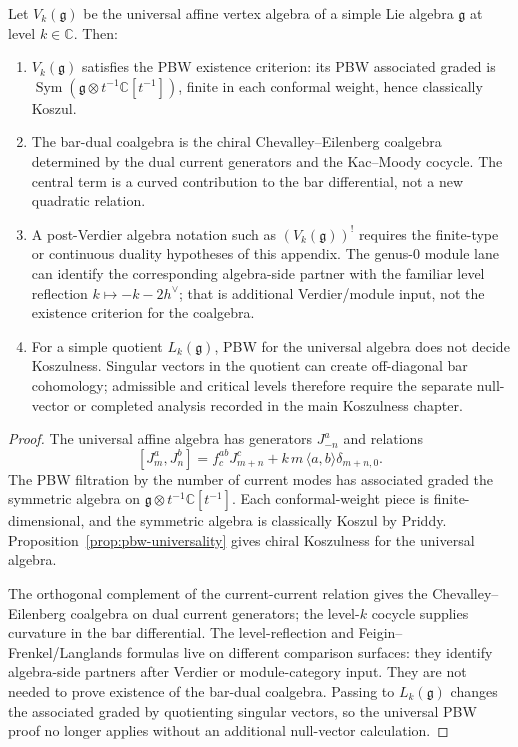 \begin{proposition}\label{prop:kac-moody-koszul-duals}
Let $V_k(\mathfrak g)$ be the universal affine vertex algebra of a
simple Lie algebra $\mathfrak g$ at level $k\in\mathbb C$. Then:
\begin{enumerate}
\item $V_k(\mathfrak g)$ satisfies the PBW existence criterion:
 its PBW associated graded is
 $\operatorname{Sym}(\mathfrak g\otimes t^{-1}\mathbb C[t^{-1}])$,
 finite in each conformal weight, hence classically Koszul.
\item The bar-dual coalgebra is the chiral Chevalley--Eilenberg
 coalgebra determined by the dual current generators and the
 Kac--Moody cocycle. The central term is a curved contribution to
 the bar differential, not a new quadratic relation.
\item A post-Verdier algebra notation such as
 $(V_k(\mathfrak g))^!$ requires the finite-type or continuous
 duality hypotheses of this appendix. The genus-$0$ module lane can
 identify the corresponding algebra-side partner with the familiar
 level reflection $k\mapsto -k-2h^\vee$; that is additional
 Verdier/module input, not the existence criterion for the coalgebra.
\item For a simple quotient $L_k(\mathfrak g)$, PBW for the universal
 algebra does not decide Koszulness. Singular vectors in the quotient
 can create off-diagonal bar cohomology; admissible and critical
 levels therefore require the separate null-vector or completed
 analysis recorded in the main Koszulness chapter.
\end{enumerate}
\end{proposition}

\begin{proof}
The universal affine algebra has generators $J^a_{-n}$ and relations
\[
[J^a_m,J^b_n]=f^{ab}_{c}J^c_{m+n}
 + k\,m\,\langle a,b\rangle\delta_{m+n,0}.
\]
The PBW filtration by the number of current modes has associated
graded the symmetric algebra on
$\mathfrak g\otimes t^{-1}\mathbb C[t^{-1}]$. Each conformal-weight
piece is finite-dimensional, and the symmetric algebra is classically
Koszul by Priddy. Proposition~\ref{prop:pbw-universality} gives
chiral Koszulness for the universal algebra.

The orthogonal complement of the current-current relation gives the
Chevalley--Eilenberg coalgebra on dual current generators; the
level-$k$ cocycle supplies curvature in the bar differential. The
level-reflection and Feigin--Frenkel/Langlands formulas live on
different comparison surfaces: they identify algebra-side partners
after Verdier or module-category input. They are not needed to prove
existence of the bar-dual coalgebra. Passing to $L_k(\mathfrak g)$
changes the associated graded by quotienting singular vectors, so the
universal PBW proof no longer applies without an additional
null-vector calculation.
\end{proof}

